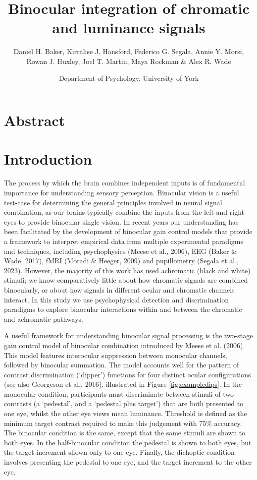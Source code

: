 \documentclass[
]{article}
\title{Binocular integration of chromatic and luminance signals}
\author{Daniel H. Baker, Kirralise J. Hansford, Federico G. Segala, Annie Y. Morsi,\\
Rowan J. Huxley, Joel T. Martin, Maya Rockman \& Alex R. Wade}
\date{Department of Psychology, University of York}
\begin{document}
\maketitle

\hypertarget{abstract}{%
\section{Abstract}\label{abstract}}

\hypertarget{introduction}{%
\section{Introduction}\label{introduction}}

The process by which the brain combines independent inputs is of fundamental importance for understanding sensory perception. Binocular vision is a useful test-case for determining the general principles involved in neural signal combination, as our brains typically combine the inputs from the left and right eyes to provide binocular single vision. In recent years our understanding has been facilitated by the development of binocular gain control models that provide a framework to interpret empirical data from multiple experimental paradigms and techniques, including psychophysics (Meese et al., 2006), EEG (Baker \& Wade, 2017), fMRI (Moradi \& Heeger, 2009) and pupillometry (Segala et al., 2023). However, the majority of this work has used achromatic (black and white) stimuli; we know comparatively little about how chromatic signals are combined binocularly, or about how signals in different ocular and chromatic channels interact. In this study we use psychophysical detection and discrimination paradigms to explore binocular interactions within and between the chromatic and achromatic pathways.

A useful framework for understanding binocular signal processing is the two-stage gain control model of binocular combination introduced by Meese et al. (2006). This model features interocular suppression between monocular channels, followed by binocular summation. The model accounts well for the pattern of contrast discrimination (`dipper') functions for four distinct ocular configurations (see also Georgeson et al., 2016), illustrated in Figure \ref{fig:exampledips}. In the monocular condition, participants must discriminate between stimuli of two contrasts (a `pedestal', and a `pedestal plus target') that are both presented to one eye, whilst the other eye views mean luminance. Threshold is defined as the minimum target contrast required to make this judgement with 75\% accuracy. The binocular condition is the same, except that the same stimuli are shown to both eyes. In the half-binocular condition the pedestal is shown to both eyes, but the target increment shown only to one eye. Finally, the dichoptic condition involves presenting the pedestal to one eye, and the target increment to the other eye.
\end{document}

